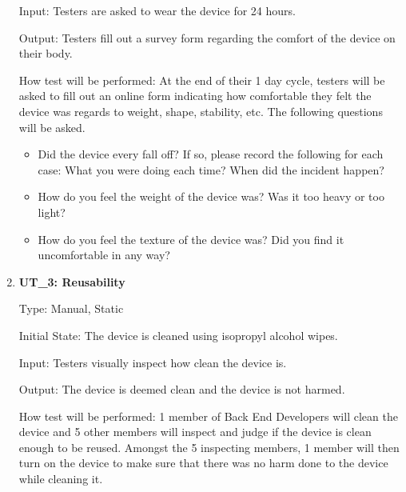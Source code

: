 \documentclass[12pt, titlepage]{article}
\begin{document}
\begin{enumerate}
Input: Testers are asked to wear the device for 24 hours.
					
Output: Testers fill out a survey form regarding the comfort of the device on their body.
					
How test will be performed: At the end of their 1 day cycle, testers will be asked to fill out an online form indicating how comfortable they felt the device was regards to weight, shape, stability, etc. The following questions will be asked.

\begin{itemize}
\item Did the device every fall off? If so, please record the following for each case: What you were doing each time? When did the incident happen?
\item How do you feel the weight of the device was? Was it too heavy or too light?
\item How do you feel the texture of the device was? Did you find it uncomfortable in any way?
\end{itemize}

\item\textbf{{UT\_3: Reusability\\}}\label{UT3}

Type: Manual, Static
					
Initial State: The device is cleaned using isopropyl alcohol wipes.
					
Input: Testers visually inspect how clean the device is.
					
Output: The device is deemed clean and the device is not harmed.
					
How test will be performed: 1 member of Back End Developers will clean the device and 5 other members will inspect and judge if the device is clean enough to be reused. Amongst the 5 inspecting members, 1 member will then turn on the device to make sure that there was no harm done to the device while cleaning it.

\end{enumerate}
\end{document}
